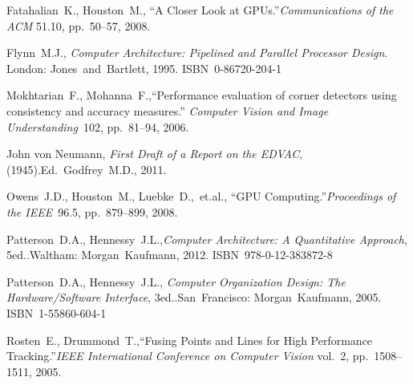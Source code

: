 {\raggedright
	\begin{thebibliography}{99}
		
			Fatahalian~K., Houston~M.,
			``A Closer Look at GPUs.''\linebreak[1]
			\textit{Communications of the ACM} 51.10, pp.~50--57, 2008.
		
			Flynn~M.J.,
			\textit{Computer Architecture: Pipelined and Parallel Processor Design}.
			\linebreak[3]
			London: Jones~and~Bartlett, 1995. ISBN~0-86720-204-1
		
			Mokhtarian~F., Mohanna~F.,\linebreak[1]
			``Performance evaluation of corner detectors using
			consistency and accuracy measures.''
			\textit{Computer Vision and Image Understanding}~102, pp.~81--94, 2006.
		
			John von Neumann,
			\textit{First Draft of a Report on the EDVAC}, (1945).\linebreak[2]
			Ed.~Godfrey~M.D., 2011.
		
			Owens~J.D., Houston~M., Luebke~D.,~et.al.,
			``GPU Computing.''\linebreak[1]
			\textit{Proceedings of the IEEE}~96.5, pp.~879--899,
			2008.
		
			Patterson~D.A., Hennessy~J.L.,\linebreak[1]
			\textit{Computer Architecture: A Quantitative Approach},
				5\nth ed..\linebreak[1]
			Waltham: Morgan~Kaufmann, 2012. ISBN~978-0-12-383872-8
		
			Patterson~D.A., Hennessy~J.L., \linebreak[1]
			\textit{Computer Organization Design: %
				The Hardware/Software Interface}, 3\rd ed..\linebreak[1]
			San~Francisco: Morgan~Kaufmann, 2005. ISBN~1-55860-604-1
		
			Rosten~E., Drummond~T.,\linebreak[1]
			``Fusing Points and Lines for High Performance Tracking.''\linebreak[1]
			\textit{IEEE International Conference on Computer Vision} vol.~2,
			pp.~1508--1511, 2005.
		

\end{thebibliography}}
